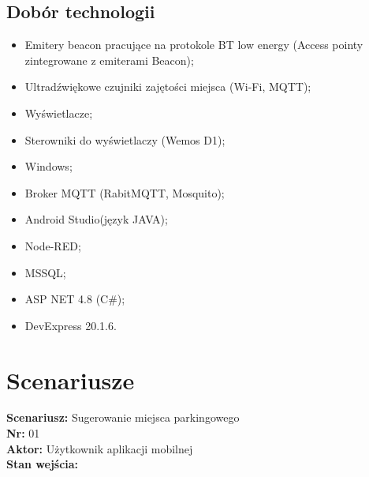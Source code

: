 \documentclass[12pt,a4paper]{article}
\begin{document}
\subsection{Dobór technologii}
\begin{itemize}
\item Emitery beacon pracujące na protokole BT low energy (Access pointy zintegrowane z emiterami Beacon);
\item Ultradźwiękowe czujniki zajętości miejsca (Wi-Fi, MQTT);
\item Wyświetlacze;
\item Sterowniki do wyświetlaczy (Wemos D1);
\item Windows;
\item Broker MQTT (RabitMQTT, Mosquito);
\item Android Studio(język JAVA);
\item Node-RED;
\item MSSQL;
\item ASP NET 4.8  (C\#);
\item DevExpress 20.1.6.
\end{itemize}



\newpage

\section{Scenariusze}
{\large \bf Scenariusz:} Sugerowanie miejsca parkingowego
\\{\bf Nr:} 01
\\{\bf Aktor:} Użytkownik aplikacji mobilnej
\\{\bf Stan wejścia:}
\end{document}
